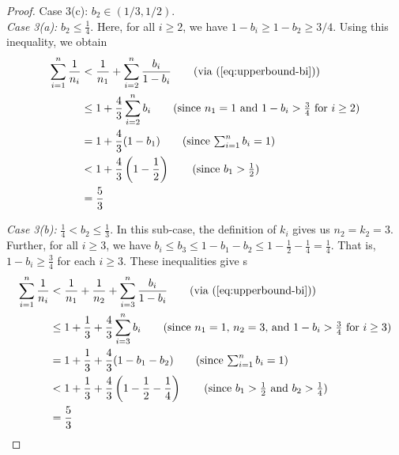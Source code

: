 \begin{proof}
\noindent
Case 3(c): $b_2 \in (1/3, 1/2)$.  \\

   
   \noindent
   \emph{Case 3(a):} $b_2 \leq \frac{1}{4}$. Here, for all $i \geq 2$, we have $1 - b_i \geq 1 - b_2 \geq 3/4$. Using this inequality, we obtain   
   \begin{align*}
    \sum_{i=1}^n\frac{1}{n_i} 
    & < \frac{1}{n_1} + \sum_{i=2}^n \frac{b_i}{1-b_i} \tag{via (\ref{eq:upperbound-bi})} \\ 
    & \leq 1 + \frac{4}{3} \sum_{i=2}^n b_i \tag{since $n_1 = 1$ and $1 - b_i> \frac{3}{4}$ for $i\geq 2$} \\
    & = 1 + \frac{4}{3}(1-b_1)   \tag{since $\sum_{i=1}^n b_i = 1$}\\
    & <  1 + \frac{4}{3}\left(1-\frac{1}{2}\right) \tag{since $b_1>\frac{1}{2}$}\\
    &= \frac{5}{3}
    \end{align*}
    
   
   \noindent
   \emph{Case 3(b):} $\frac{1}{4} < b_2 \leq \frac{1}{3}$. In this sub-case, the definition of $k_i$ gives us $n_2 = k_2 = 3$. Further, for all $i \geq 3$, we have $b_i \leq b_3 \leq 1 - b_1 - b_2 \leq 1 - \frac{1}{2} - \frac{1}{4} = \frac{1}{4}$. That is, $1 - b_i \geq \frac{3}{4}$ for each $i \geq 3$. These inequalities give s 
    \begin{align*}
    \sum_{i=1}^n\frac{1}{n_i} 
    & < \frac{1}{n_1} + \frac{1}{n_2} + \sum_{i=3}^n \frac{b_i}{1-b_i} \tag{via (\ref{eq:upperbound-bi})} \\ 
    & \leq 1 + \frac{1}{3} + \frac{4}{3} \sum_{i=3}^n b_i \tag{since $n_1 = 1$, $n_2 = 3$, and $1 - b_i> \frac{3}{4}$ for $i\geq 3$} \\
    & = 1 + \frac{1}{3} +  \frac{4}{3}(1-b_1 - b_2)   \tag{since $\sum_{i=1}^n b_i = 1$}\\
    & <  1 + \frac{1}{3} + \frac{4}{3}\left(1-\frac{1}{2} - \frac{1}{4} \right) \tag{since $b_1>\frac{1}{2}$ and $b_2 > \frac{1}{4}$}\\
    &= \frac{5}{3}
    \end{align*}


\end{proof}
